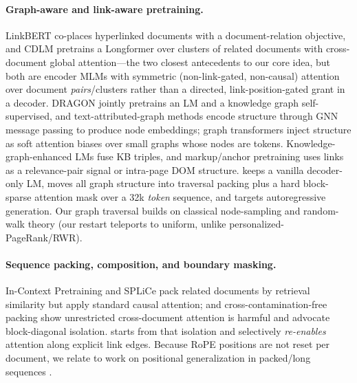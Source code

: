\paragraph{Graph-aware and link-aware pretraining.}
LinkBERT \citep{yasunaga2022linkbert} co-places hyperlinked documents with a
document-relation objective, and CDLM \citep{caciularu2021cdlm} pretrains a Longformer
over clusters of related documents with cross-document global attention---the two
closest antecedents to our core idea, but both are encoder MLMs with symmetric
(non-link-gated, non-causal) attention over document \emph{pairs}/clusters rather than a
directed, link-position-gated grant in a decoder. DRAGON \citep{yasunaga2022dragon}
jointly pretrains an LM and a knowledge graph self-supervised, and text-attributed-graph
methods \citep{yang2021graphformers,jin2023patton,zhao2023glem,he2024tape,chien2021giant,zou2023thlm}
encode structure through GNN message passing to produce node embeddings; graph
transformers \citep{ying2021graphormer,rampasek2022graphgps,kim2022tokengt,dwivedi2021graphtransformer,shirzad2023exphormer}
inject structure as soft attention biases over small graphs whose nodes are tokens.
Knowledge-graph-enhanced LMs \citep{peters2019knowbert,zhang2019ernie,wang2021kepler,liu2020kbert,zhang2022greaselm}
fuse KB triples, and markup/anchor pretraining
\citep{aghajanyan2021htlm,li2022markuplm,wang2022webformer,chang2020pretrainingretrieval,ma2021harp,zhou2022hlp}
uses links as a relevance-pair signal or intra-page DOM structure. \method keeps a
vanilla decoder-only LM, moves all graph structure into traversal packing plus a hard
block-sparse attention mask over a 32k \emph{token} sequence, and targets autoregressive
generation. Our graph traversal builds on classical node-sampling
\citep{perozzi2014deepwalk,grover2016node2vec,hamilton2017graphsage} and random-walk
theory \citep{page1999pagerank,tong2006rwr} (our restart teleports to uniform, unlike
personalized-PageRank/RWR).

\paragraph{Sequence packing, composition, and boundary masking.}
In-Context Pretraining \citep{shi2024incontext} and SPLiCe
\citep{staniszewski2025structured} pack related documents by retrieval similarity but
apply standard causal attention; \citet{zhao2024analysing} and cross-contamination-free
packing \citep{krell2021packing} show unrestricted cross-document attention is harmful
and advocate block-diagonal isolation. \method starts from that isolation and
selectively \emph{re-enables} attention along explicit link edges. Because RoPE
positions are not reset per document, we relate to work on positional generalization in
packed/long sequences \citep{kazemnejad2023positional,ruoss2023randomized,chen2023positioninterpolation}.

